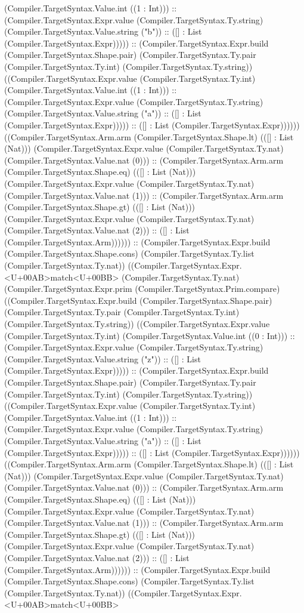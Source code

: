 \documentclass[11pt]{article}
\begin{document}
(Compiler.TargetSyntax.Value.int ((1 : Int))) :: (Compiler.TargetSyntax.Expr.value (Compiler.TargetSyntax.Ty.string) (Compiler.TargetSyntax.Value.string ("b")) :: ([] : List (Compiler.TargetSyntax.Expr))))) :: (Compiler.TargetSyntax.Expr.build (Compiler.TargetSyntax.Shape.pair) (Compiler.TargetSyntax.Ty.pair (Compiler.TargetSyntax.Ty.int) (Compiler.TargetSyntax.Ty.string)) ((Compiler.TargetSyntax.Expr.value (Compiler.TargetSyntax.Ty.int) (Compiler.TargetSyntax.Value.int ((1 : Int))) :: (Compiler.TargetSyntax.Expr.value (Compiler.TargetSyntax.Ty.string) (Compiler.TargetSyntax.Value.string ("a")) :: ([] : List (Compiler.TargetSyntax.Expr))))) :: ([] : List (Compiler.TargetSyntax.Expr)))))) ((Compiler.TargetSyntax.Arm.arm (Compiler.TargetSyntax.Shape.lt) (([] : List (Nat))) (Compiler.TargetSyntax.Expr.value (Compiler.TargetSyntax.Ty.nat) (Compiler.TargetSyntax.Value.nat (0))) :: (Compiler.TargetSyntax.Arm.arm (Compiler.TargetSyntax.Shape.eq) (([] : List (Nat))) (Compiler.TargetSyntax.Expr.value (Compiler.TargetSyntax.Ty.nat) (Compiler.TargetSyntax.Value.nat (1))) :: (Compiler.TargetSyntax.Arm.arm (Compiler.TargetSyntax.Shape.gt) (([] : List (Nat))) (Compiler.TargetSyntax.Expr.value (Compiler.TargetSyntax.Ty.nat) (Compiler.TargetSyntax.Value.nat (2))) :: ([] : List (Compiler.TargetSyntax.Arm)))))) :: (Compiler.TargetSyntax.Expr.build (Compiler.TargetSyntax.Shape.cons) (Compiler.TargetSyntax.Ty.list (Compiler.TargetSyntax.Ty.nat)) ((Compiler.TargetSyntax.Expr.<U+00AB>match<U+00BB> (Compiler.TargetSyntax.Ty.nat) (Compiler.TargetSyntax.Expr.prim (Compiler.TargetSyntax.Prim.compare) ((Compiler.TargetSyntax.Expr.build (Compiler.TargetSyntax.Shape.pair) (Compiler.TargetSyntax.Ty.pair (Compiler.TargetSyntax.Ty.int) (Compiler.TargetSyntax.Ty.string)) ((Compiler.TargetSyntax.Expr.value (Compiler.TargetSyntax.Ty.int) (Compiler.TargetSyntax.Value.int ((0 : Int))) :: (Compiler.TargetSyntax.Expr.value (Compiler.TargetSyntax.Ty.string) (Compiler.TargetSyntax.Value.string ("z")) :: ([] : List (Compiler.TargetSyntax.Expr))))) :: (Compiler.TargetSyntax.Expr.build (Compiler.TargetSyntax.Shape.pair) (Compiler.TargetSyntax.Ty.pair (Compiler.TargetSyntax.Ty.int) (Compiler.TargetSyntax.Ty.string)) ((Compiler.TargetSyntax.Expr.value (Compiler.TargetSyntax.Ty.int) (Compiler.TargetSyntax.Value.int ((1 : Int))) :: (Compiler.TargetSyntax.Expr.value (Compiler.TargetSyntax.Ty.string) (Compiler.TargetSyntax.Value.string ("a")) :: ([] : List (Compiler.TargetSyntax.Expr))))) :: ([] : List (Compiler.TargetSyntax.Expr)))))) ((Compiler.TargetSyntax.Arm.arm (Compiler.TargetSyntax.Shape.lt) (([] : List (Nat))) (Compiler.TargetSyntax.Expr.value (Compiler.TargetSyntax.Ty.nat) (Compiler.TargetSyntax.Value.nat (0))) :: (Compiler.TargetSyntax.Arm.arm (Compiler.TargetSyntax.Shape.eq) (([] : List (Nat))) (Compiler.TargetSyntax.Expr.value (Compiler.TargetSyntax.Ty.nat) (Compiler.TargetSyntax.Value.nat (1))) :: (Compiler.TargetSyntax.Arm.arm (Compiler.TargetSyntax.Shape.gt) (([] : List (Nat))) (Compiler.TargetSyntax.Expr.value (Compiler.TargetSyntax.Ty.nat) (Compiler.TargetSyntax.Value.nat (2))) :: ([] : List (Compiler.TargetSyntax.Arm)))))) :: (Compiler.TargetSyntax.Expr.build (Compiler.TargetSyntax.Shape.cons) (Compiler.TargetSyntax.Ty.list (Compiler.TargetSyntax.Ty.nat)) ((Compiler.TargetSyntax.Expr.<U+00AB>match<U+00BB> 
\end{document}
